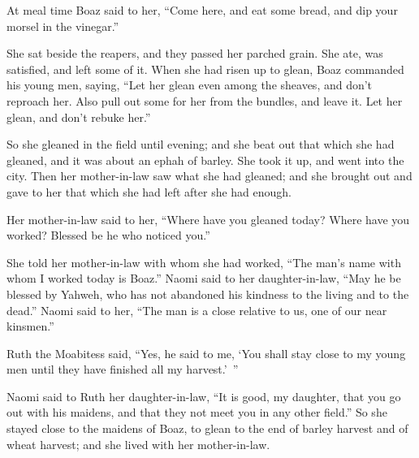 {\par }{\PP {}At meal time Boaz said to her, “Come here, and eat some bread, and dip your morsel in the vinegar.”
\par }{\PP She sat beside the reapers, and they passed her parched grain. She ate, was satisfied, and left some of it.
When she had risen up to glean, Boaz commanded his young men, saying, “Let her glean even among the sheaves, and don’t reproach her.
Also pull out some for her from the bundles, and leave it. Let her glean, and don’t rebuke her.”
\par }{\PP {}So she gleaned in the field until evening; and she beat out that which she had gleaned, and it was about an ephah of barley.
She took it up, and went into the city. Then her mother-in-law saw what she had gleaned; and she brought out and gave to her that which she had left after she had enough.
\par }{\PP {}Her mother-in-law said to her, “Where have you gleaned today? Where have you worked? Blessed be he who noticed you.”
\par }{\PP She told her mother-in-law with whom she had worked, “The man’s name with whom I worked today is Boaz.”
Naomi said to her daughter-in-law, “May he be blessed by Yahweh, who has not abandoned his kindness to the living and to the dead.” Naomi said to her, “The man is a close relative to us, one of our near kinsmen.”
\par }{\PP {}Ruth the Moabitess said, “Yes, he said to me, ‘You shall stay close to my young men until they have finished all my harvest.’ ”
\par }{\PP {}Naomi said to Ruth her daughter-in-law, “It is good, my daughter, that you go out with his maidens, and that they not meet you in any other field.”
So she stayed close to the maidens of Boaz, to glean to the end of barley harvest and of wheat harvest; and she lived with her mother-in-law.

}
